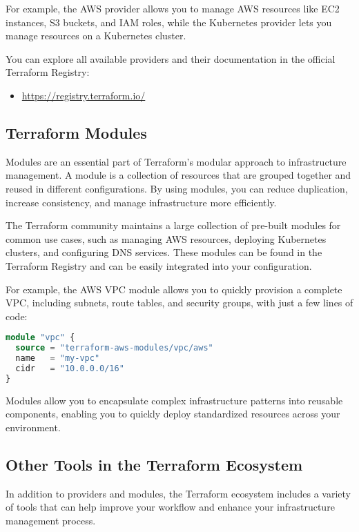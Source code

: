 For example, the AWS provider allows you to manage AWS resources like EC2 instances, S3 buckets, and IAM roles, while the Kubernetes provider lets you manage resources on a Kubernetes cluster.

You can explore all available providers and their documentation in the official Terraform Registry:

\begin{itemize}
  \item \url{https://registry.terraform.io/}
\end{itemize}

\subsection{Terraform Modules}

Modules are an essential part of Terraform's modular approach to infrastructure management. A module is a collection of resources that are grouped together and reused in different configurations. By using modules, you can reduce duplication, increase consistency, and manage infrastructure more efficiently.

The Terraform community maintains a large collection of pre-built modules for common use cases, such as managing AWS resources, deploying Kubernetes clusters, and configuring DNS services. These modules can be found in the Terraform Registry and can be easily integrated into your configuration.

For example, the AWS VPC module allows you to quickly provision a complete VPC, including subnets, route tables, and security groups, with just a few lines of code:

\begin{lstlisting}[language=terraform]
module "vpc" {
  source = "terraform-aws-modules/vpc/aws"
  name   = "my-vpc"
  cidr   = "10.0.0.0/16"
}
\end{lstlisting}

Modules allow you to encapsulate complex infrastructure patterns into reusable components, enabling you to quickly deploy standardized resources across your environment.

\subsection{Other Tools in the Terraform Ecosystem}

In addition to providers and modules, the Terraform ecosystem includes a variety of tools that can help improve your workflow and enhance your infrastructure management process.

